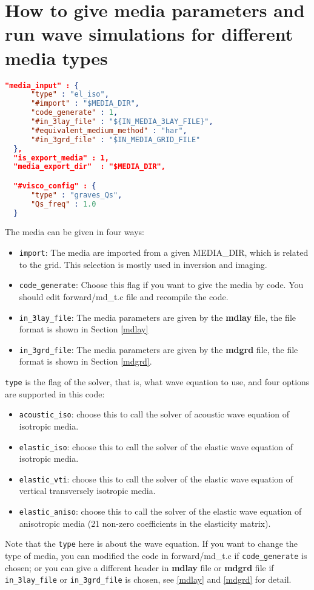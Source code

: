 
\chapter{How to give media parameters and run wave simulations for different media types}\label{chapter-media}


\begin{lstlisting}[language=json, title=run\_test.sh, frame=tb]
  "media_input" : {
      "type" : "el_iso",
      "#import" : "$MEDIA_DIR",
      "code_generate" : 1,
      "#in_3lay_file" : "${IN_MEDIA_3LAY_FILE}",
      "#equivalent_medium_method" : "har",
      "#in_3grd_file" : "$IN_MEDIA_GRID_FILE"
  },
  "is_export_media" : 1,
  "media_export_dir"  : "$MEDIA_DIR",

  "#visco_config" : {
      "type" : "graves_Qs",
      "Qs_freq" : 1.0
  }
\end{lstlisting}

The media can be given in four ways:
\begin{itemize}
  \item \texttt{import}: The media are imported from a given MEDIA\_DIR, which is related to the grid. This selection is mostly used in inversion and imaging.  
  \item \texttt{code\_generate}: Choose this flag if you want to give the media by code. You should edit forward/md\_t.c file and recompile the code.
  \item \texttt{in\_3lay\_file}: The media parameters are given by the \textbf{mdlay} file, the file format is shown in Section \ref{mdlay} 
  \item \texttt{in\_3grd\_file}: The media parameters are given by the \textbf{mdgrd} file, the file format is shown in Section \ref{mdgrd}.
\end{itemize}

\texttt{type} is the flag of the solver, that is, what wave equation to use, and four options are supported in this code:
\begin{itemize}
  \item \texttt{acoustic\_iso}: choose this to call the solver of acoustic wave equation of isotropic media.  
  \item \texttt{elastic\_iso}: choose this to call the solver of the elastic wave equation of isotropic media.
  \item \texttt{elastic\_vti}: choose this to call the solver of the elastic wave equation of vertical transversely isotropic media. 
  \item \texttt{elastic\_aniso}: choose this to call the solver of the elastic wave equation of anisotropic media (21 non-zero coefficients in the elasticity matrix). 
\end{itemize}
Note that the \texttt{type} here is about the wave equation. If you want to change the type of media, you can modified the code in forward/md\_t.c if \texttt{code\_generate} is chosen; or you can give a different header in \textbf{mdlay} file or \textbf{mdgrd} file if \texttt{in\_3lay\_file} or \texttt{in\_3grd\_file} is chosen, see \ref{mdlay} and \ref{mdgrd} for detail.

